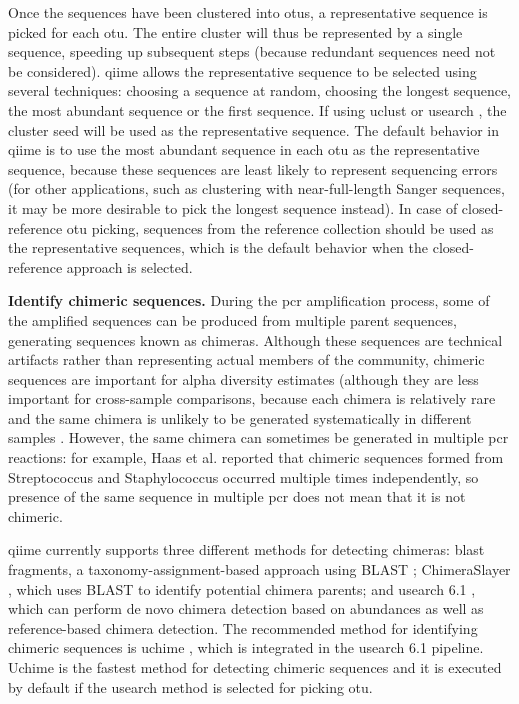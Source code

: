Once the sequences have been clustered into \gls{otu}s, a representative sequence
is picked for each \gls{otu}. The entire cluster will thus be represented by a single
sequence, speeding up subsequent steps (because redundant sequences need not be
considered). \gls{qiime} allows the representative sequence to be selected using
several techniques: choosing a sequence at random, choosing the longest sequence,
the most abundant sequence or the first sequence. If using uclust or usearch \cite{Edgar2010},
the cluster seed will be used as the representative sequence. The default behavior
in \gls{qiime} is to use the most abundant sequence in each \gls{otu} as the
representative sequence, because these sequences are least likely to represent
sequencing errors (for other applications, such as clustering with near-full-length
Sanger sequences, it may be more desirable to pick the longest sequence instead).
In case of closed-reference \gls{otu} picking, sequences from the reference collection
should be used as the representative sequences, which is the default behavior when
the closed-reference approach is selected.

\textbf{Identify chimeric sequences.} During the \gls{pcr} amplification process,
some of the amplified sequences can be produced from multiple parent sequences,
generating sequences known as chimeras. Although these sequences are technical
artifacts rather than representing actual members of the community, chimeric sequences
are important for alpha diversity estimates (although they are less important for
cross-sample comparisons, because each chimera is relatively rare and the same
chimera is unlikely to be generated systematically in different samples \cite{Ley2008}.
However, the same chimera can sometimes be generated in multiple \gls{pcr} reactions:
for example, Haas et al. \cite{Haas2011} reported that chimeric sequences formed
from Streptococcus and Staphylococcus occurred multiple times independently, so
presence of the same sequence in multiple \gls{pcr} does not mean that it is not chimeric.

\gls{qiime} currently supports three different methods for detecting chimeras: blast
fragments, a \hspace{0.01cm} taxonomy-assignment-based \hspace{0.01cm} approach \hspace{0.01cm} using \hspace{0.01cm} BLAST \cite{Altschul1990};
ChimeraSlayer \cite{Haas2011}, which uses BLAST to identify potential chimera parents;
and usearch 6.1 \cite{Edgar2010}, which can perform de novo chimera detection based on
abundances as well as reference-based chimera detection. The recommended method for
identifying chimeric sequences is uchime \cite{Edgar2011}, which is integrated in
the usearch 6.1 \cite{Edgar2010} pipeline. Uchime is the fastest method for detecting
chimeric sequences and it is executed by default if the usearch method is selected
for picking \gls{otu}.

